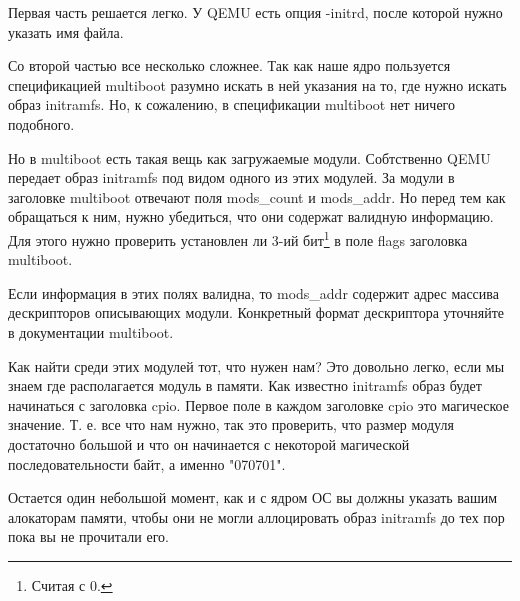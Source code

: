 Первая часть решается легко. У QEMU есть опция -initrd, после которой нужно
указать имя файла.

Со второй частью все несколько сложнее. Так как наше ядро пользуется спецификацией
multiboot разумно искать в ней указания на то, где нужно искать образ initramfs.
Но, к сожалению, в спецификации multiboot нет ничего подобного.

Но в multiboot есть такая вещь как загружаемые модули. Собтственно QEMU передает
образ initramfs под видом одного из этих модулей. За модули в заголовке multiboot
отвечают поля mods\_count и mods\_addr. Но перед тем как обращаться к ним, нужно
убедиться, что они содержат валидную информацию. Для этого нужно проверить
установлен ли 3-ий бит\footnote{Считая с 0.} в поле flags заголовка multiboot.

Если информация в этих полях валидна, то mods\_addr содержит адрес массива
дескрипторов описывающих модули. Конкретный формат дескриптора уточняйте в
документации multiboot.

Как найти среди этих модулей тот, что нужен нам? Это довольно легко, если мы
знаем где располагается модуль в памяти. Как известно initramfs образ будет
начинаться с заголовка cpio. Первое поле в каждом заголовке cpio это магическое
значение. Т. е. все что нам нужно, так это проверить, что размер модуля достаточно
большой и что он начинается с некоторой магической последовательности байт, а
именно "070701".

Остается один небольшой момент, как и с ядром ОС вы должны указать вашим
алокаторам памяти, чтобы они не могли аллоцировать образ initramfs до тех пор
пока вы не прочитали его.
